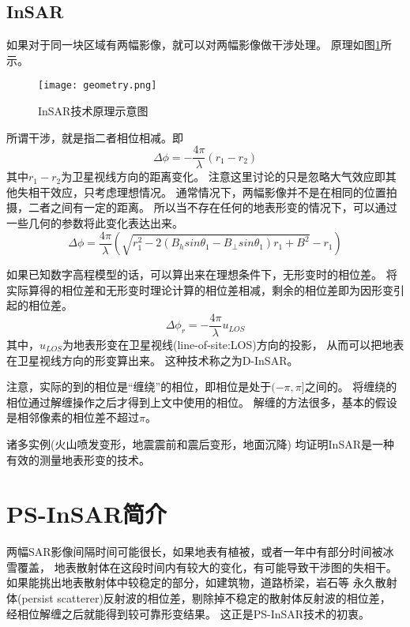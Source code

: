 \subsection{InSAR}
如果对于同一块区域有两幅影像，就可以对两幅影像做干涉处理。
原理如图\ref{fig:geometry}所示。
\begin{figure}[htb!]
    \centering
    \texttt{[image: geometry.png]}
    \caption{InSAR技术原理示意图}
    \label{fig:geometry}
\end{figure}
所谓干涉，就是指二者相位相减。即
\begin{equation}
    \Delta \phi=-\frac{4\pi}{\lambda}(r_1-r_2)
\end{equation}
其中$r_1-r_2$为卫星视线方向的距离变化。
注意这里讨论的只是忽略大气效应即其他失相干效应，只考虑理想情况。
通常情况下，两幅影像并不是在相同的位置拍摄，二者之间有一定的距离。
所以当不存在任何的地表形变的情况下，可以通过一些几何的参数将此变化表达出来。
\begin{equation}
    \Delta \phi=\frac{4\pi}{\lambda}\left(\sqrt{r_1^2−2(B_hsinθ_1−B_{\perp}sinθ_1)r_1+B^2}−r_1\right)
\end{equation}

如果已知数字高程模型的话，可以算出来在理想条件下，无形变时的相位差。
将实际算得的相位差和无形变时理论计算的相位差相减，剩余的相位差即为因形变引起的相位差。
\begin{equation}
    \Delta \phi_{r}=-\frac{4\pi}{\lambda}u_{LOS}
\end{equation}
其中，$u_{LOS}$为地表形变在卫星视线(line-of-site:LOS)方向的投影，
从而可以把地表在卫星视线方向的形变算出来。
这种技术称之为D-InSAR。

注意，实际的到的相位是“缠绕”的相位，即相位是处于$(-\pi,\pi]$之间的。
将缠绕的相位通过解缠操作之后才得到上文中使用的相位。
解缠的方法很多，基本的假设是相邻像素的相位差不超过$\pi$。

诸多实例(火山喷发变形，地震震前和震后变形，地面沉降)
均证明InSAR是一种有效的测量地表形变的技术。

\section{PS-InSAR简介}
两幅SAR影像间隔时间可能很长，如果地表有植被，或者一年中有部分时间被冰雪覆盖，
地表散射体在这段时间内有较大的变化，有可能导致干涉图的失相干。
如果能挑出地表散射体中较稳定的部分，如建筑物，道路桥梁，岩石等
永久散射体(persist scatterer)反射波的相位差，剔除掉不稳定的散射体反射波的相位差，
经相位解缠之后就能得到较可靠形变结果。
这正是PS-InSAR技术的初衷。

